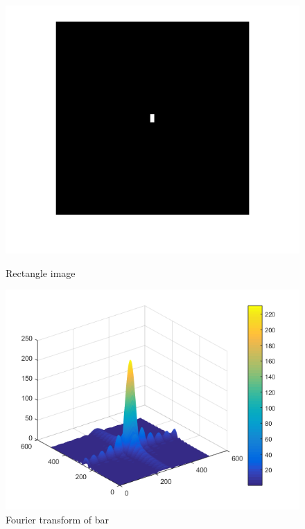 \begin{figure}[H]
	\centering
	\begin{minipage}[t]{0.4\textwidth}
		\includegraphics[width=\textwidth]{images/Rectangle.png}
		\caption{Rectangle image}
		\label{fig:rectangle}
	\end{minipage}
	\begin{minipage}[t]{0.4\textwidth}
		\includegraphics[width=\textwidth]{images/fouriertraforectangle.png}
		\caption{Fourier transform of bar}
		\label{fig:fouriertraforectangle}
	\end{minipage}
\end{figure}

